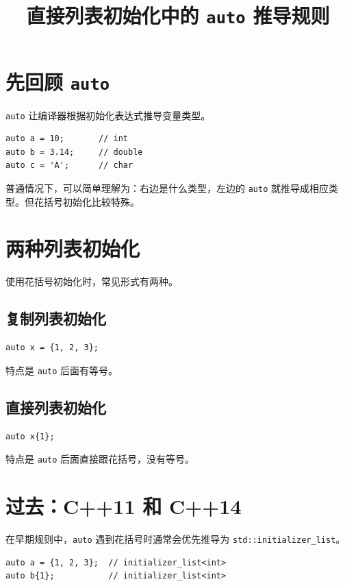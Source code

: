\documentclass[UTF8,12pt,a4paper]{ctexart}
\title{\textbf{直接列表初始化中的 \texttt{auto} 推导规则}}
\author{}
\date{}
\begin{document}
\maketitle

\section{先回顾 \texttt{auto}}

\texttt{auto} 让编译器根据初始化表达式推导变量类型。

\begin{lstlisting}
auto a = 10;       // int
auto b = 3.14;     // double
auto c = 'A';      // char
\end{lstlisting}

普通情况下，可以简单理解为：右边是什么类型，左边的 \texttt{auto} 就推导成相应类型。但花括号初始化比较特殊。

\section{两种列表初始化}

使用花括号初始化时，常见形式有两种。

\subsection{复制列表初始化}

\begin{lstlisting}
auto x = {1, 2, 3};
\end{lstlisting}

特点是 \texttt{auto} 后面有等号。

\subsection{直接列表初始化}

\begin{lstlisting}
auto x{1};
\end{lstlisting}

特点是 \texttt{auto} 后面直接跟花括号，没有等号。

\section{过去：C++11 和 C++14}

在早期规则中，\texttt{auto} 遇到花括号时通常会优先推导为 \texttt{std::initializer\_list}。

\begin{lstlisting}
auto a = {1, 2, 3};  // initializer_list<int>
auto b{1};           // initializer_list<int>
\end{lstlisting}
\end{document}
